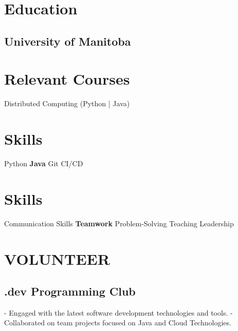  

\begin{minipage}[t]{0.36\textwidth}
    \section{Education} 
      \subsection{University of Manitoba}
    \sectionsep

    \section{Relevant Courses} 
      Distributed Computing (Python | Java) \\
    \sectionsep

    \section{Skills} 
      Python \textbullet{} \textbf{Java} \textbullet{} Git \textbullet{} CI/CD  \\
    \skillsVSpace

    \section{Skills}
      Communication Skills \textbullet{} \textbf{Teamwork} \textbullet{} Problem-Solving \textbullet{} Teaching \textbullet{} Leadership \\
    \skillsVSpace
    \sectionsep

    \section{VOLUNTEER} 
      \subsection{.dev Programming Club}
      - Engaged with the latest software development technologies and tools. \newline
      - Collaborated on team projects focused on Java and Cloud Technologies.
    \sectionsep


\end{minipage}
